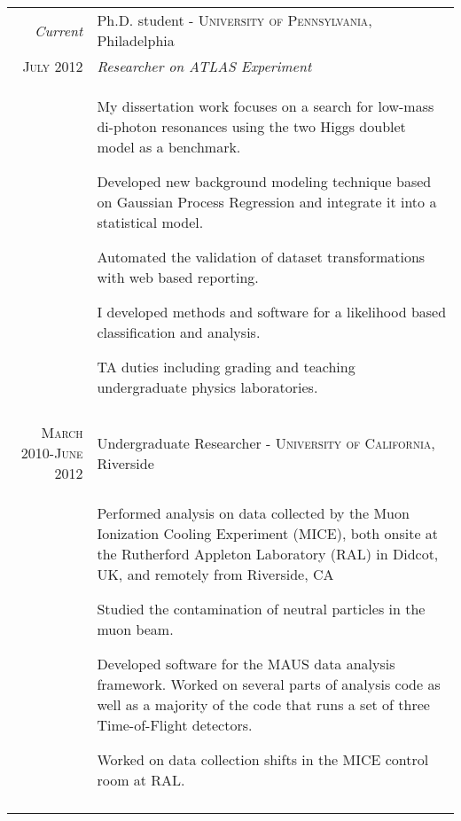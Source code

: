 \documentclass[a4paper,10pt]{article} %
\begin{document}
\begin{longtable}{r|p{11cm}}
\emph{Current}    & Ph.D. student - \textsc{University of Pennsylvania}, Philadelphia \\
\textsc{July 2012} & \emph{Researcher on ATLAS Experiment}\\
				   & \begin{itemize}
					 \footnotesize{
						\item My dissertation work focuses on a search for low-mass di-photon resonances using the two Higgs doublet model as a benchmark.
            \item Developed new background modeling technique based on Gaussian Process Regression and integrate it into a statistical model.
            \item Automated the validation of dataset transformations with web based reporting.
						\item I developed methods and software for a likelihood based classification and analysis.
						\item TA duties including grading and teaching undergraduate physics laboratories.
					 }
					 \end{itemize} \\
\multicolumn{2}{c}{} \\

\pagebreak
\textsc{March 2010-June 2012} & Undergraduate Researcher - \textsc{University of California}, Riverside \emph{}\\
				  & \begin{itemize}
					\footnotesize{
						\item Performed analysis on data collected by the Muon Ionization Cooling Experiment (MICE), both onsite at the Rutherford Appleton Laboratory (RAL) in Didcot, UK, and remotely from Riverside, CA
						\item Studied the contamination of neutral particles in the muon beam.
					  \item Developed software for the MAUS data analysis framework.  Worked on several parts of analysis code as well as a majority of the code that runs a set of three Time-of-Flight detectors.
						\item Worked on data collection shifts in the MICE control room at RAL.
					}
			        \end{itemize} \\
\multicolumn{2}{c}{} \\


\end{longtable}
\end{document}
